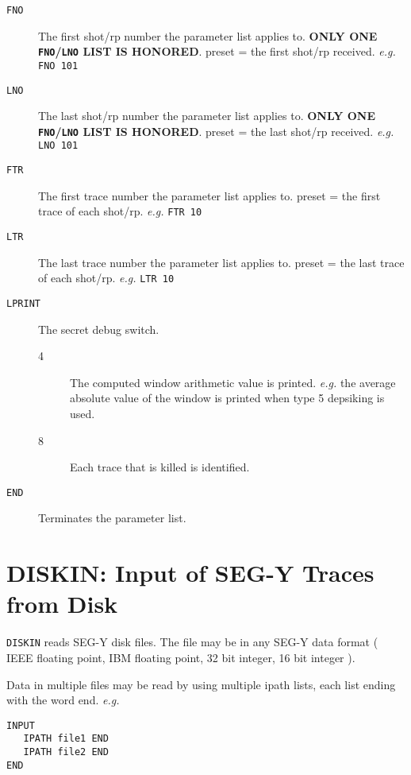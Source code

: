 \begin{description}
\item[\texttt{FNO}] The first \gls{shot}/\gls{rp} number the parameter list applies to.
    \textbf{ONLY ONE \texttt{FNO}/\texttt{LNO} LIST IS HONORED}.
         \Gls{preset} = the first \gls{shot}/\gls{rp} received.    \textit{e.g.}   \texttt{FNO 101}

\item[\texttt{LNO}] The last \gls{shot}/\gls{rp} number the parameter list applies to.
    \textbf{ONLY ONE \texttt{FNO}/\texttt{LNO} LIST IS HONORED}.
         \Gls{preset} = the last \gls{shot}/\gls{rp} received.    \textit{e.g.}   \texttt{LNO 101}

\item[\texttt{FTR}] The first trace number the parameter list applies to.
         \Gls{preset} = the first trace of each \gls{shot}/\gls{rp}.    \textit{e.g.}   \texttt{FTR 10}

\item[\texttt{LTR}] The last trace number the parameter list applies to.
         \Gls{preset} = the last trace of each \gls{shot}/\gls{rp}.    \textit{e.g.}   \texttt{LTR 10}

\item[\texttt{LPRINT}] The secret debug switch.
\begin{description}
    \item[4] The computed window arithmetic value is printed.  \textit{e.g.}
        the average absolute value of the window is printed when type 5
        depsiking is used.
     \item[8] Each trace that is killed is identified.
\end{description}

\item[\texttt{END}] Terminates the parameter list.
\end{description}

\section{DISKIN: Input of SEG-Y Traces from Disk}
\label{cmd_diskin}

\texttt{DISKIN} reads SEG-Y disk files.  The file may be in any SEG-Y data
format ( IEEE floating point, IBM floating point, 32 bit integer,
16 bit integer ).

Data in multiple files may be read by using multiple ipath lists,
each list ending with the word  end.  \textit{e.g.}
\begin{verbatim}
INPUT
   IPATH file1 END
   IPATH file2 END
END
\end{verbatim}

